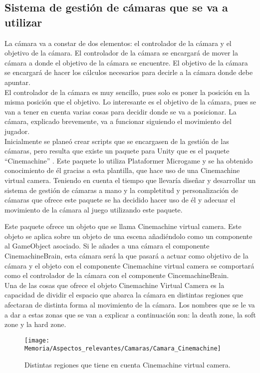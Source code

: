 \subsection{Sistema de gestión de cámaras que se va a utilizar}
La cámara va a constar de dos elementos: el controlador de la cámara y el objetivo de la cámara. El controlador de la cámara se encargará de mover la cámara a donde el objetivo de la cámara se encuentre. El objetivo de la cámara se encargará de hacer los cálculos necesarios para decirle a la cámara donde debe apuntar.\\
El controlador de la cámara es muy sencillo, pues solo es poner la posición en la misma posición que el objetivo. Lo interesante es el objetivo de la cámara, pues se van a tener en cuenta varias cosas para decidir donde se va a posicionar. La cámara, explicado brevemente, va a funcionar siguiendo el movimiento del jugador.\\
Inicialmente se planeó crear scripts que se encargasen de la gestión de las cámaras, pero resulta que existe un paquete para Unity que es el paquete “Cinemachine” \cite{PaqueteCinemachine}. Este paquete lo utiliza Plataformer Microgame y se ha obtenido conocimiento de él gracias a esta plantilla, que hace uso de una Cinemachine virtual camera. Teniendo en cuenta el tiempo que llevaría diseñar y desarrollar un sistema de gestión de cámaras a mano y la completitud y personalización de cámaras que ofrece este paquete se ha decidido hacer uso de él y adecuar el movimiento de la cámara al juego utilizando este paquete.

Este paquete ofrece un objeto que se llama Cinemachine virtual camera. Este objeto se aplica sobre un objeto de una escena añadiéndolo como un componente al GameObject asociado. Si le añades a una cámara el componente CinemachineBrain, esta cámara será la que pasará a actuar como objetivo de la cámara y el objeto con el componente Cinemachine virtual camera se comportará como el controlador de la cámara con el componente CincemachineBrain.\\
Una de las cosas que ofrece el objeto Cinemachine Virtual Camera es la capacidad de dividir el espacio que abarca la cámara en distintas regiones que afectaran de distinta forma al movimiento de la cámara. Los nombres que se le va a dar a estas zonas que se van a explicar a continuación son: la death zone, la soft zone y la hard zone. 

\clearpage
\begin{figure}[h]
\texttt{[image: Memoria/Aspectos\_relevantes/Camaras/Camara\_Cinemachine]}
\caption{Distintas regiones que tiene en cuenta Cinemachine virtual camera.}
\end{figure}

